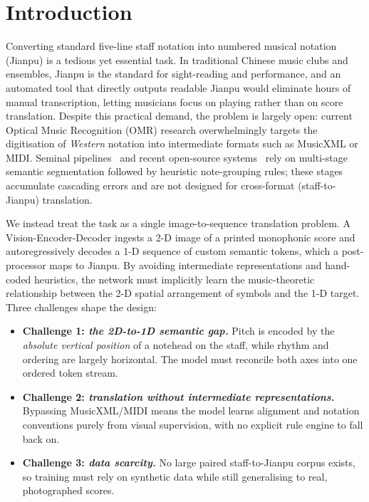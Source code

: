 \section{Introduction}
\label{section:intro}

Converting standard five-line staff notation into numbered musical notation
(Jianpu) is a tedious yet essential task. In traditional Chinese music clubs and
ensembles, Jianpu is the standard for sight-reading and performance, and an
automated tool that directly outputs readable Jianpu would eliminate hours of
manual transcription, letting musicians focus on playing rather than on score
translation. Despite this practical demand, the problem is largely open: current
Optical Music Recognition (OMR) research overwhelmingly targets the digitisation
of \emph{Western} notation into intermediate formats such as MusicXML or MIDI.
Seminal pipelines~\citep{calvo2020understanding} and recent open-source
systems~\citep{oemer2023} rely on multi-stage semantic segmentation followed by
heuristic note-grouping rules; these stages accumulate cascading errors and are
not designed for cross-format (staff-to-Jianpu) translation.

We instead treat the task as a single image-to-sequence translation problem. A
Vision-Encoder-Decoder ingests a 2-D image of a printed monophonic score and
autoregressively decodes a 1-D sequence of custom semantic tokens, which a
post-processor maps to Jianpu. By avoiding intermediate representations and
hand-coded heuristics, the network must implicitly learn the music-theoretic
relationship between the 2-D spatial arrangement of symbols and the 1-D target.
Three challenges shape the design:
\begin{itemize}
    \item \textbf{Challenge 1: \textit{the 2D-to-1D semantic gap.}} Pitch is
    encoded by the \emph{absolute vertical position} of a notehead on the staff,
    while rhythm and ordering are largely horizontal. The model must reconcile
    both axes into one ordered token stream.
    \item \textbf{Challenge 2: \textit{translation without intermediate
    representations.}} Bypassing MusicXML/MIDI means the model learns alignment
    and notation conventions purely from visual supervision, with no explicit
    rule engine to fall back on.
    \item \textbf{Challenge 3: \textit{data scarcity.}} No large paired
    staff-to-Jianpu corpus exists, so training must rely on synthetic data while
    still generalising to real, photographed scores.
\end{itemize}

